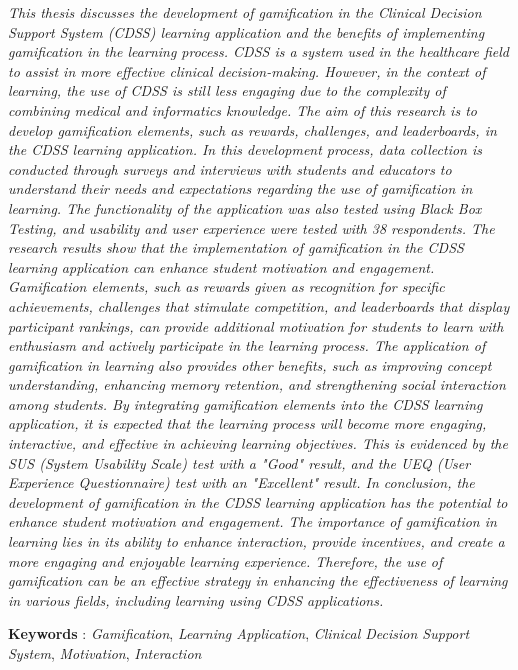 \textit{
	This thesis discusses the development of gamification in the Clinical Decision Support System (CDSS) learning application and the benefits of implementing gamification in the learning process. CDSS is a system used in the healthcare field to assist in more effective clinical decision-making. However, in the context of learning, the use of CDSS is still less engaging due to the complexity of combining medical and informatics knowledge.
The aim of this research is to develop gamification elements, such as rewards, challenges, and leaderboards, in the CDSS learning application. In this development process, data collection is conducted through surveys and interviews with students and educators to understand their needs and expectations regarding the use of gamification in learning. The functionality of the application was also tested using Black Box Testing, and usability and user experience were tested with 38 respondents.
The research results show that the implementation of gamification in the CDSS learning application can enhance student motivation and engagement. Gamification elements, such as rewards given as recognition for specific achievements, challenges that stimulate competition, and leaderboards that display participant rankings, can provide additional motivation for students to learn with enthusiasm and actively participate in the learning process.
The application of gamification in learning also provides other benefits, such as improving concept understanding, enhancing memory retention, and strengthening social interaction among students. By integrating gamification elements into the CDSS learning application, it is expected that the learning process will become more engaging, interactive, and effective in achieving learning objectives. This is evidenced by the SUS (System Usability Scale) test with a "Good" result, and the UEQ (User Experience Questionnaire) test with an "Excellent" result.
In conclusion, the development of gamification in the CDSS learning application has the potential to enhance student motivation and engagement. The importance of gamification in learning lies in its ability to enhance interaction, provide incentives, and create a more engaging and enjoyable learning experience. Therefore, the use of gamification can be an effective strategy in enhancing the effectiveness of learning in various fields, including learning using CDSS applications.
}

\noindent\textbf{Keywords} : \textit{Gamification}, \textit{Learning Application}, \textit{Clinical Decision Support System}, \textit{Motivation}, \textit{Interaction}